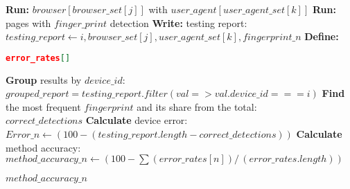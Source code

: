 \documentclass[]{article}
\begin{document}
\begin{algorithm}
\begin{algorithmic}[1]
                    \STATE \textbf{Run:} $browser[browser\_set[j]]$ with $user\_agent[user\_agent\_set[k]]$
                        \STATE \textbf{Run:} pages with $finger\_print$ detection
                        \STATE \textbf{Write:} testing report: \\
                        $testing\_report \gets { i, browser\_set[j], user\_agent\_set[k], fingerprint\_n }$
                    \ENDFOR
                \ENDFOR
            \ENDFOR
        \ENDFOR 
        \medbreak
        \STATE \textbf{Define:}\\
        \begin{lstlisting}[language=json,firstnumber=1]
error_rates[]
        \end{lstlisting}
            \STATE \textbf{Group} results by $device\_id:$\\
            $grouped\_report = testing\_report.filter(val => val.device\_id === i)$
            \STATE \textbf{Find} the most frequent $fingerprint$ and its share from the total:\\
            $correct\_detections$
            \STATE \textbf{Calculate} device error:\\
            $Error\_n \gets (100 - (testing\_report.length - correct\_detections))$
        \ENDFOR
        \medbreak
        \STATE \textbf{Calculate} method accuracy:\\
        $method\_accuracy\_n \gets (100 - \sum(error\_rates[n]) /\,(error\_rates.length))$
        \medbreak

		\RETURN $method\_accuracy\_n$
		\end{algorithmic}
	  \end{algorithm}
	  
\end{document}
